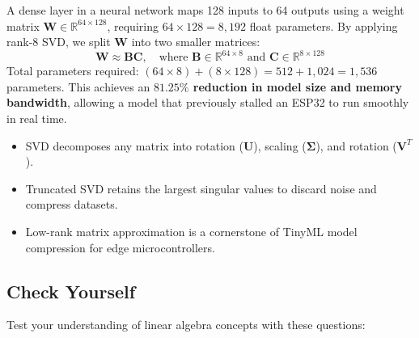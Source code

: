 \begin{iotbox}
A dense layer in a neural network maps 128 inputs to 64 outputs using a weight matrix $\mathbf{W} \in \mathbb{R}^{64 \times 128}$, requiring $64 \times 128 = 8{,}192$ float parameters.
By applying rank-$8$ SVD, we split $\mathbf{W}$ into two smaller matrices:
\begin{equation*}
\mathbf{W} \approx \mathbf{B}\mathbf{C}, \quad \text{where } \mathbf{B} \in \mathbb{R}^{64 \times 8} \text{ and } \mathbf{C} \in \mathbb{R}^{8 \times 128}
\end{equation*}
Total parameters required: $(64 \times 8) + (8 \times 128) = 512 + 1{,}024 = 1{,}536$ parameters.
This achieves an \textbf{$81.25\%$ reduction in model size and memory bandwidth}, allowing a model that previously stalled an ESP32 to run smoothly in real time.
\end{iotbox}

\begin{takeaways}
\begin{itemize}
    \item SVD decomposes any matrix into rotation ($\mathbf{U}$), scaling ($\mathbf{\Sigma}$), and rotation ($\mathbf{V}^T$).
    \item Truncated SVD retains the largest singular values to discard noise and compress datasets.
    \item Low-rank matrix approximation is a cornerstone of TinyML model compression for edge microcontrollers.
\end{itemize}
\end{takeaways}

\subsection{Check Yourself}

Test your understanding of linear algebra concepts with these questions:

